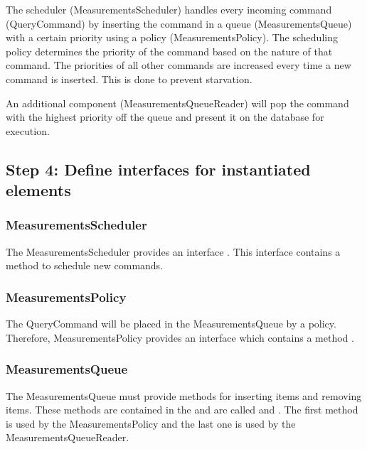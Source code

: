 \npar The scheduler (MeasurementsScheduler) handles every incoming command
(QueryCommand) by inserting the command in a queue (MeasurementsQueue) with a
certain priority using a policy (MeasurementsPolicy). The scheduling policy
determines the priority of the command based on the nature of that command. The
priorities of all other commands are increased every time a new command is
inserted. This is done to prevent starvation.

\npar An additional component (MeasurementsQueueReader) will pop the command
with the highest priority off the queue and present it on the database for execution. 

\subsection{Step 4: Define interfaces for instantiated elements}
\label{add:it3/interfaces}

\subsubsection{MeasurementsScheduler}

\npar The MeasurementsScheduler provides an interface
. This interface contains a method
 to schedule new commands.

\subsubsection{MeasurementsPolicy}

\npar The QueryCommand will be placed in the MeasurementsQueue by a policy.
Therefore, MeasurementsPolicy provides an interface
 which contains a method
.

\subsubsection{MeasurementsQueue}

\npar The MeasurementsQueue must provide methods for inserting items and
removing items. These methods are contained in the
 and are called
 and
. The first method is used by the
MeasurementsPolicy and the last one is used by the MeasurementsQueueReader.

